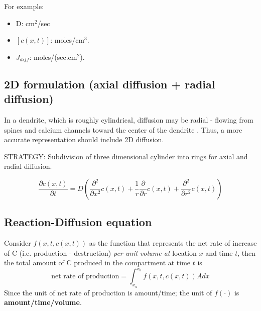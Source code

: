 

For example:
\begin{itemize}
\item D: cm$^2$/sec
\item $[c(x,t)]$: moles/cm$^3$.
\item $J_{diff}$: moles/(sec.cm$^2$).
\end{itemize}

\subsection{2D formulation (axial diffusion + radial diffusion)}

In a dendrite, which is roughly cylindrical, diffusion may be radial - flowing
from spines and calcium channels toward the center of the dendrite
\citep{DeSchutter1998}.  Thus, a more accurate representation should include 2D
diffusion.

STRATEGY: Subdivision of three dimensional cylinder into rings for axial and
radial diffusion.

\begin{equation}
\frac{\partial c(x,t)}{\partial t} =
D \left( \frac{\partial^2}{\partial x^2} c(x,t) + 
\frac{1}{r}\frac{\partial }{\partial r}c(x,t) +
\frac{\partial^2}{\partial r^2} c(x,t)
 \right) 
\end{equation}


\subsection{Reaction-Diffusion equation}
\label{sec:react-diff-equat}

Consider $f(x,t,c(x,t))$ as the function that represents the net rate
of increase of C (i.e. production - destruction)
{\it per unit volume at} location $x$ and time $t$, then the total
amount of C produced in the compartment at time $t$ is
\begin{equation}
  \label{eq:799}
 \text{net rate of production} = \int_{x_a}^{x_b} f(x,t,c(x,t)) A dx
\end{equation}
Since the unit of net rate of production is amount/time; the unit of
$f(\cdot)$ is {\bf amount/time/volume}.

